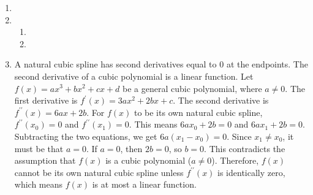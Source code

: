 \documentclass[12pt]{article}
\begin{document}
\begin{enumerate}[leftmargin=2em]
    \item

    \item
    \begin{enumerate}
        \item
        \item
    \end{enumerate}

    \item
    \begin{enumerate}
        A natural cubic spline has second derivatives equal to \(0\) at the endpoints. The second derivative of a cubic 
        polynomial is a linear function. Let \(f(x)=ax^{3}+bx^{2}+cx+d\) be a general cubic polynomial, where \(a\ne 0\). 
        The first derivative is \(f^{\prime }(x)=3ax^{2}+2bx+c\). The second derivative is \(f^{\prime \prime }
        (x)=6ax+2b\). For \(f(x)\) to be its own natural cubic spline, \(f^{\prime \prime }(x_{0})=0\) and 
        \(f^{\prime\prime }(x_{1})=0\). This means \(6ax_{0}+2b=0\) and \(6ax_{1}+2b=0\). Subtracting the two equations, we 
        get \(6a(x_{1}-x_{0})=0\). Since \(x_{1}\ne x_{0}\), it must be that \(a=0\). If \(a=0\), then \(2b=0\), so 
        \(b=0\). This contradicts the assumption that \(f(x)\) is a cubic polynomial (\(a\ne 0\)). Therefore, \(f(x)\) 
        cannot be its own natural cubic spline unless \(f^{\prime \prime }(x)\) is identically zero, which means \(f(x)\) 
        is at most a linear function.
    \end{enumerate}
    

\end{enumerate}
\end{document}
